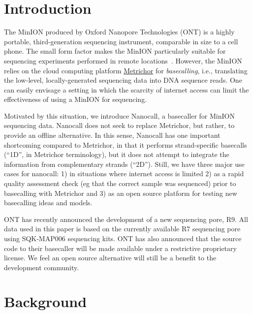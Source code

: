 \documentclass{bioinfo}
\begin{document}
\maketitle

\section{Introduction}

The MinION produced by Oxford Nanopore Technologies (ONT) is a highly portable, third-generation sequencing instrument, comparable in size to a cell phone. The small form factor makes the MinION particularly suitable for sequencing experiments performed in remote locations~\cite{quick-ebola}. However, the MinION relies on the cloud computing platform \href{metrichor.com}{Metrichor} for \emph{basecalling}, i.e., translating the low-level, locally-generated sequencing data into DNA sequence reads. One can easily envisage a setting in which the scarcity of internet access can limit the effectiveness of using a MinION for sequencing.

Motivated by this situation, we introduce Nanocall, a basecaller for MinION sequencing data. Nanocall does not seek to replace Metrichor, but rather, to provide an offline alternative. In this sense, Nanocall has one important shortcoming compared to Metrichor, in that it performs strand-specific basecalls (``1D'', in Metrichor terminology), but it does not attempt to integrate the information from complementary strands (``2D''). Still, we have three major use cases for nanocall: 1) in situations where internet access is limited 2) as a rapid quality assessment check (eg that the correct sample was sequenced) prior to basecalling with Metrichor and 3) as an open source platform for testing new basecalling ideas and models.

ONT has recently announced the development of a new sequencing pore, R9. All data used in this paper is based on the currently available R7 sequencing pore using SQK-MAP006 sequencing kits. ONT has also announced that the source code to their basecaller will be made available under a restrictive proprietary license. We feel an open source alternative will still be a benefit to the development community.
 
\section{Background}
\end{document}
